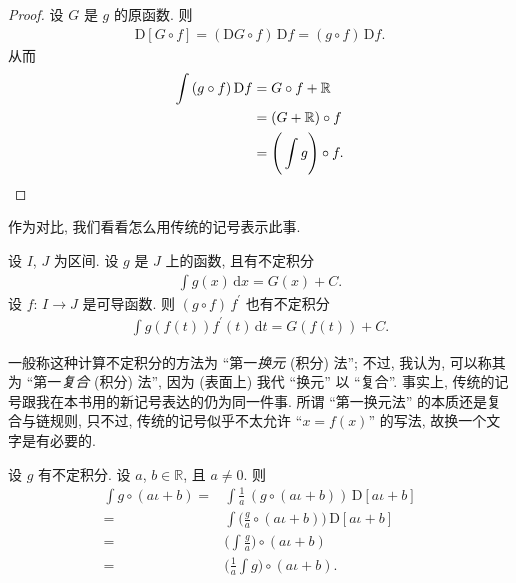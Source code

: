 \begin{proof}
    设 $G$ 是 $g$ 的原函数.
    则
    \begin{align*}
        \mathrm{D}[G \circ f] = (\mathrm{D}G \circ f)\, \mathrm{D}f = (g \circ f)\, \mathrm{D}f.
    \end{align*}
    从而
    \begin{align*}
        \int {(g \circ f)\, \mathrm{D}f}
        = {} & G \circ f + \mathbb{R}                   \\
        = {} & (G + \mathbb{R}) \circ f                 \\
        = {} & \Bigg( \int {g} \Bigg) \circ f. \qedhere
    \end{align*}
\end{proof}

\begin{remark}
    作为对比, 我们看看怎么用传统的记号表示此事.

    设 $I$, $J$ 为区间.
    设 $g$ 是 $J$ 上的函数, 且有不定积分
    \begin{align*}
        \int {g(x)\,\mathrm{d}x} = G(x) + C.
    \end{align*}
    设 $f$: $I \to J$ 是可导函数.
    则 $(g \circ f)\, f^{\prime}$ 也有不定积分
    \begin{align*}
        \int {g(f(t))f^{\prime}(t)\,\mathrm{d}t} = G(f(t)) + C.
    \end{align*}

    一般称这种计算不定积分的方法为 ``第一\emph{换元} (积分) 法'';
    不过, 我认为, 可以称其为 ``第一\emph{复合} (积分) 法'',
    因为 (表面上) 我代 ``换元'' 以 ``复合''.
    事实上, 传统的记号跟我在本书用的新记号表达的仍为同一件事.
    所谓 ``第一换元法'' 的本质还是复合与链规则,
    只不过, 传统的记号似乎不太允许 ``$x = f(x)$'' 的写法,
    故换一个文字是有必要的.
\end{remark}

\begin{example}
    设 $g$ 有不定积分.
    设 $a$, $b \in \mathbb{R}$, 且 $a \neq 0$.
    则
    \begin{align*}
        \int {g \circ (a\iota + b)}
        = {} & \int {\frac{1}{a}\, (g \circ (a\iota + b))\,\mathrm{D}[a\iota + b]}         \\
        = {} & \int {\Bigg( \frac{g}{a} \circ (a\iota + b) \Bigg)\,\mathrm{D}[a\iota + b]} \\
        = {} & \Bigg( \int {\frac{g}{a}} \Bigg) \circ (a\iota + b)                         \\
        = {} & \Bigg( \frac{1}{a} \int {g} \Bigg) \circ (a\iota + b).
    \end{align*}
\end{example}

